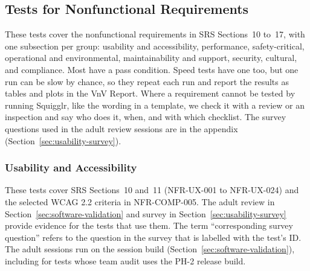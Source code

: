 \documentclass[12pt, titlepage]{article}
\begin{document}
\subsection{Tests for Nonfunctional Requirements}
\label{sec:nfr-tests}

These tests cover the nonfunctional requirements in SRS Sections~10 to~17,
with one subsection per group: usability and accessibility, performance,
safety-critical, operational and environmental, maintainability and support,
security, cultural, and compliance. Most have a pass condition. Speed tests
have one too, but one run can be slow by chance, so they repeat each run and
report the results as tables and plots in the VnV Report. Where a requirement cannot be
tested by running Squigglr, like the wording in a template, we check it with a
review or an inspection and say who does it, when, and with which checklist.
The survey questions used in the adult review sessions are in the appendix
(Section~\ref{sec:usability-survey}).

\subsubsection{Usability and Accessibility}
\label{sec:ux-tests}

These tests cover SRS Sections~10 and~11 (NFR-UX-001 to NFR-UX-024) and
the selected WCAG 2.2 criteria in NFR-COMP-005. The adult review 
in Section~\ref{sec:software-validation} and survey in 
Section~\ref{sec:usability-survey} provide evidence for the tests that
use them. The term ``corresponding survey question'' refers to the question
in the survey that is labelled with the test's ID. The adult sessions run on the
session build (Section~\ref{sec:software-validation}), including for tests whose
team audit uses the PH-2 release build.
\end{document}
